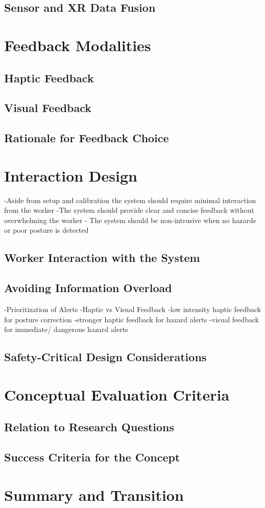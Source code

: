 \subsection{Sensor and XR Data Fusion}

\section{Feedback Modalities}
\subsection{Haptic Feedback}
\subsection{Visual Feedback}
\subsection{Rationale for Feedback Choice}

\section{Interaction Design}
-Aside from setup and calibration the system should require minimal interaction from the worker
-The system should provide clear and concise feedback without overwhelming the worker
- The system should be non-intrusive when no hazards or poor posture is detected
\subsection{Worker Interaction with the System}

\subsection{Avoiding Information Overload}
-Prioritization of Alerts
-Haptic vs Visual Feedback
-low intensity haptic feedback for posture correction
-stronger haptic feedback for hazard alerts
-visual feedback for immediate/ dangerous hazard alerts
\subsection{Safety-Critical Design Considerations}


\section{Conceptual Evaluation Criteria}
\subsection{Relation to Research Questions}
\subsection{Success Criteria for the Concept}

\section{Summary and Transition}
